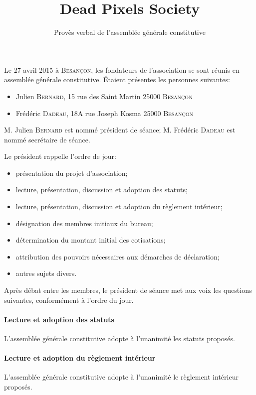 \documentclass{article}
\title{Dead Pixels Society}
\author{Provès verbal de l'assemblée générale constitutive}
\date{}
\begin{document}
\maketitle


Le 27 avril 2015 à \textsc{Besançon}, les fondateurs de l'association se sont réunis en assemblée générale constitutive. Étaient présentes les personnes suivantes:
\begin{itemize}
\item
  Julien \textsc{Bernard}, 15 rue des Saint Martin 25000 \textsc{Besançon}
\item
  Frédéric \textsc{Dadeau}, 18A rue Joseph Kosma 25000 \textsc{Besançon}
\end{itemize}


M. Julien \textsc{Bernard} est nommé président de séance;
M. Frédéric \textsc{Dadeau} est nommé secrétaire de séance.

Le président rappelle l'ordre de jour:
\begin{itemize}
\item
  présentation du projet d'association;
\item
  lecture, présentation, discussion et adoption des statuts;
\item
  lecture, présentation, discussion et adoption du règlement intérieur;
\item
  désignation des membres initiaux du bureau;
\item
  détermination du montant initial des cotisations;
\item
  attribution des pouvoirs nécessaires aux démarches de déclaration;
\item
  autres sujets divers.
\end{itemize}

Après débat entre les membres, le président de séance met aux voix les questions suivantes, conformément à l'ordre du jour.

\paragraph{Lecture et adoption des statuts}

L'assemblée générale constitutive adopte à l'unanimité les statuts proposés.

\paragraph{Lecture et adoption du règlement intérieur}

L'assemblée générale constitutive adopte à l'unanimité le règlement intérieur proposés.
\end{document}
